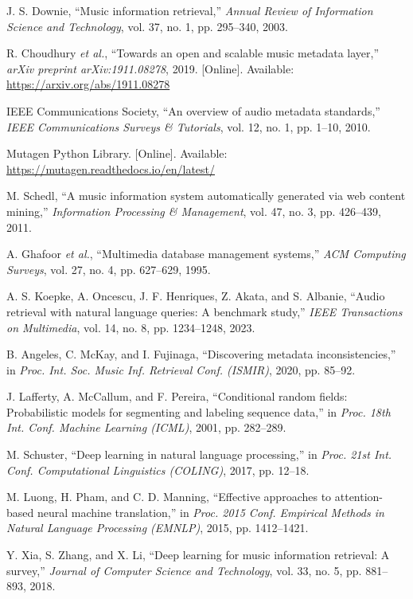 \documentclass[conference]{IEEEtran}
\begin{document}
\renewcommand\refname{TÀI LIỆU THAM KHẢO}
\begin{thebibliography}{99}

J. S. Downie, “Music information retrieval,” \textit{Annual Review of Information Science and Technology}, vol. 37, no. 1, pp. 295--340, 2003.

R. Choudhury \textit{et al.}, “Towards an open and scalable music metadata layer,” \textit{arXiv preprint arXiv:1911.08278}, 2019. [Online]. Available: \url{https://arxiv.org/abs/1911.08278}

IEEE Communications Society, “An overview of audio metadata standards,” \textit{IEEE Communications Surveys \& Tutorials}, vol. 12, no. 1, pp. 1--10, 2010.

Mutagen Python Library. [Online]. Available: \url{https://mutagen.readthedocs.io/en/latest/}

M. Schedl, “A music information system automatically generated via web content mining,” \textit{Information Processing \& Management}, vol. 47, no. 3, pp. 426--439, 2011.

A. Ghafoor \textit{et al.}, “Multimedia database management systems,” \textit{ACM Computing Surveys}, vol. 27, no. 4, pp. 627--629, 1995.

A. S. Koepke, A. Oncescu, J. F. Henriques, Z. Akata, and S. Albanie, “Audio retrieval with natural language queries: A benchmark study,” \textit{IEEE Transactions on Multimedia}, vol. 14, no. 8, pp. 1234--1248, 2023.

B. Angeles, C. McKay, and I. Fujinaga, “Discovering metadata inconsistencies,” in \textit{Proc. Int. Soc. Music Inf. Retrieval Conf. (ISMIR)}, 2020, pp. 85--92.

J. Lafferty, A. McCallum, and F. Pereira, “Conditional random fields: Probabilistic models for segmenting and labeling sequence data,” in \textit{Proc. 18th Int. Conf. Machine Learning (ICML)}, 2001, pp. 282--289.

M. Schuster, “Deep learning in natural language processing,” in \textit{Proc. 21st Int. Conf. Computational Linguistics (COLING)}, 2017, pp. 12--18.

M. Luong, H. Pham, and C. D. Manning, “Effective approaches to attention-based neural machine translation,” in \textit{Proc. 2015 Conf. Empirical Methods in Natural Language Processing (EMNLP)}, 2015, pp. 1412--1421.

Y. Xia, S. Zhang, and X. Li, “Deep learning for music information retrieval: A survey,” \textit{Journal of Computer Science and Technology}, vol. 33, no. 5, pp. 881--893, 2018.

\end{thebibliography}
\end{document}

